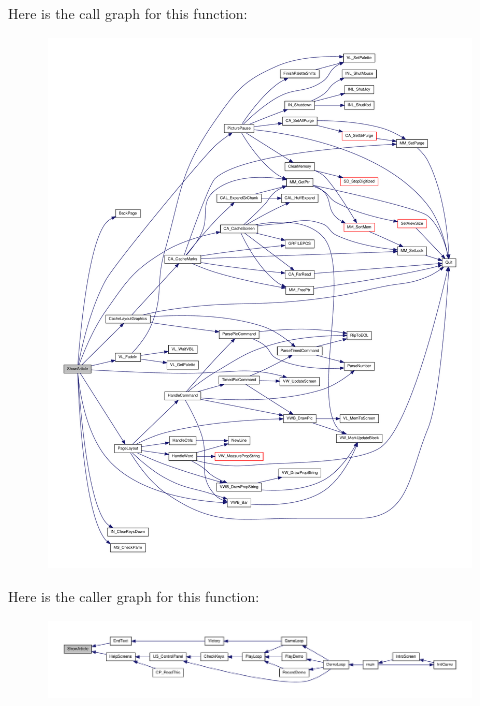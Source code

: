 Here is the call graph for this function:
\nopagebreak
\begin{figure}[H]
\begin{center}
\leavevmode
\includegraphics[width=400pt]{WL__TEXT_8C_ab5697774e1a05a1e3e51b02688f1561f_cgraph}
\end{center}
\end{figure}




Here is the caller graph for this function:
\nopagebreak
\begin{figure}[H]
\begin{center}
\leavevmode
\includegraphics[width=400pt]{WL__TEXT_8C_ab5697774e1a05a1e3e51b02688f1561f_icgraph}
\end{center}
\end{figure}


